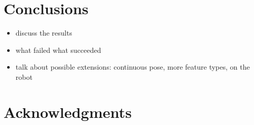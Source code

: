 \documentclass[conference]{IEEEtran}
\begin{document}
\section{Conclusions}
\begin{itemize}
\item discuss the results
\item what failed what succeeded
\item talk about possible extensions: continuous pose, more feature types, on the robot
\end{itemize}

\section*{Acknowledgments}

\cite{McGeer01041990}







\end{document}
